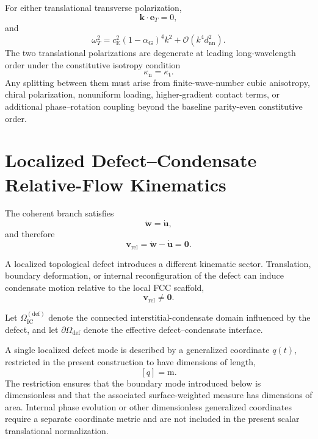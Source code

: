 For either translational transverse polarization,
\begin{equation}
    \mathbf k\cdot\mathbf e_T=0,
\end{equation}
and
\begin{equation}
    \omega_T^2
    =
    c_{\mathrm E}^2(1-\alpha_{\mathrm G})^4k^2
    +\mathcal O(k^4d_{\mathrm{nn}}^2).
\end{equation}
The two translational polarizations are degenerate at leading long-wavelength order under the constitutive isotropy condition
\begin{equation}
    \kappa_{\mathrm n}=\kappa_{\mathrm t}.
\end{equation}
Any splitting between them must arise from finite-wave-number cubic anisotropy, chiral polarization, nonuniform loading, higher-gradient contact terms, or additional phase--rotation coupling beyond the baseline parity-even constitutive order.

\section{Localized Defect--Condensate Relative-Flow Kinematics}
\label{sec:AP_localized_kinematics}

The coherent branch satisfies
\begin{equation}
    \dot{\mathbf{w}} = \dot{\mathbf{u}},
\end{equation}
and therefore
\begin{equation}
    \mathbf{v}_{\mathrm{rel}} = \dot{\mathbf{w}}-\dot{\mathbf{u}} = \mathbf{0}.
\end{equation}

A localized topological defect introduces a different kinematic sector. Translation, boundary deformation, or internal reconfiguration of the defect can induce condensate motion relative to the local FCC scaffold,
\begin{equation}
    \mathbf{v}_{\mathrm{rel}} \neq \mathbf{0}.
\end{equation}

Let $\Omega_{\mathrm{IC}}^{(\mathrm{def})}$ denote the connected interstitial-condensate domain influenced by the defect, and let $\partial\Omega_{\mathrm{def}}$ denote the effective defect--condensate interface.

A single localized defect mode is described by a generalized coordinate $q(t)$, restricted in the present construction to have dimensions of length,
\begin{equation}
    \boxed{ [q]=\mathrm{m} }.
\end{equation}
The restriction ensures that the boundary mode introduced below is dimensionless and that the associated surface-weighted measure has dimensions of area. Internal phase evolution or other dimensionless generalized coordinates require a separate coordinate metric and are not included in the present scalar translational normalization.

